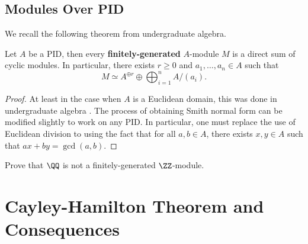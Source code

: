 \subsection{Modules Over PID}
We recall the following theorem from undergraduate algebra.
\begin{theorem}
    \label{thm:pid_structure}
    Let $A$ be a PID, then every \textbf{finitely-generated} $A$-module $M$ 
    is a direct sum of cyclic modules. 
    In particular, there exists $r\geq 0$
    and $a_1,\dots,a_n\in A$ such that
    $$M\simeq A^{\oplus r} \oplus \bigoplus_{i=1}^n 
    A/(a_i).$$
\end{theorem}
\begin{proof}
    At least in the case when $A$ is a Euclidean domain,
    this was done in undergraduate algebra
    \cite[Theorem 14.7.3]{artin}.
    The process of obtaining Smith normal form
    can be modified slightly to work on any PID.
    In particular, one must replace the use of Euclidean division
    to using the fact that for all $a,b\in A$,
    there exists $x,y\in A$ such that $ax+by=\gcd(a,b)$.
\end{proof}
\begin{exercise}
Prove that $\QQ$ is not a finitely-generated $\ZZ$-module.
\end{exercise}
%
%
%
%
%
\section{Cayley-Hamilton Theorem and Consequences}
\label{sec:cayley}
